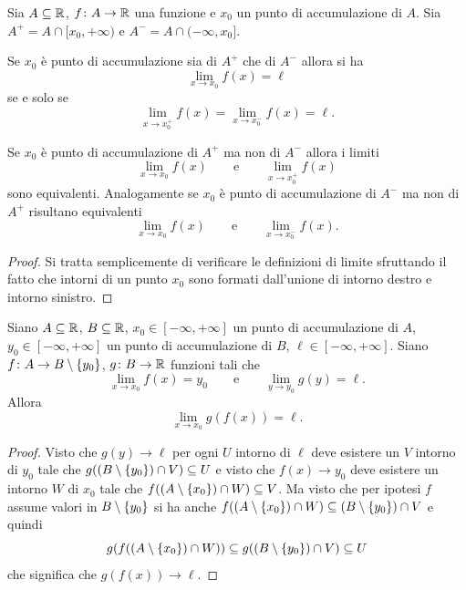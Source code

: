 \begin{theorem}
\mymark{*}
Sia $A\subseteq \mathbb R$, $f\colon A \to \mathbb R$ una funzione e $x_0$ un punto di accumulazione
di $A$. Sia $A^+ = A \cap [x_0,+\infty)$ e $A^- = A \cap (-\infty, x_0]$.

Se $x_0$ è punto di accumulazione sia di $A^+$ che di $A^-$
allora si ha
\[
  \lim_{x\to x_0} f(x) = \ell
\]
se e solo se
\[
  \lim_{x\to x_0^+} f(x) = \lim_{x\to x_0^-} f(x) = \ell.
\]

Se $x_0$ è punto di accumulazione di $A^+$ ma non di $A^-$ allora
i limiti
\[
  \lim_{x\to x_0} f(x) \qquad \text{e}\qquad \lim_{x\to x_0^+} f(x)
\]
sono equivalenti. Analogamente se $x_0$ è punto di accumulazione
di $A^-$ ma non di $A^+$ risultano equivalenti
\[
  \lim_{x\to x_0} f(x) \qquad \text{e}\qquad \lim_{x\to x_0^-} f(x).
\]
\end{theorem}
%
\begin{proof}
Si tratta semplicemente di verificare le definizioni di limite sfruttando il fatto che intorni di un punto $x_0$ sono formati dall'unione di intorno destro e intorno sinistro.
\end{proof}


\begin{theorem}
\label{th:limite_composta}
Siano $A\subseteq \mathbb R$, $B\subseteq \mathbb R$,
$x_0\in [-\infty,+\infty]$ un punto di accumulazione di $A$,
$y_0\in [-\infty,+\infty]$ un punto di accumulazione di $B$,
$\ell\in [-\infty,+\infty]$.
Siano $f\colon A \to B\setminus{\left\{ y_0 \right\}}$, $g\colon B\to \mathbb R$
funzioni tali che
\[
  \lim_{x\to x_0} f(x) = y_0
\qquad
\text{e}
\qquad
  \lim_{y\to y_0} g(y) = \ell.
\]
Allora
\[
 \lim_{x\to x_0} g(f(x)) = \ell.
\]
\end{theorem}
%
\begin{proof}
Visto che $g(y)\to \ell$
per ogni $U$ intorno di $\ell$ deve esistere un $V$ intorno di $y_0$
tale che $g((B\setminus{\left\{ y_0 \right\}})\cap V) \subseteq U$
e visto  che $f(x)\to y_0$ deve esistere un intorno $W$ di $x_0$
tale che $f((A\setminus{\left\{ x_0 \right\}})\cap W) \subseteq V$.
Ma visto che per ipotesi $f$ assume valori in $B\setminus{\left\{ y_0 \right\}}$
si ha anche $f((A\setminus{\left\{ x_0 \right\}})\cap W)\subseteq (B\setminus{\left\{ y_0 \right\}}) \cap V$
e quindi
\[
  g(f((A\setminus{\left\{ x_0 \right\}})\cap W)) \subseteq g((B\setminus {\left\{ y_0 \right\}}) \cap V)
  \subseteq U
\]
che significa che $g(f(x)) \to \ell$.
\end{proof}

